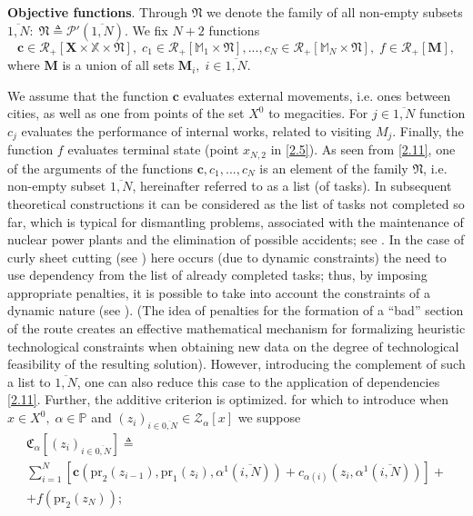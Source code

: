 \documentclass[10pt]{article}
\begin{document}
{\bf Objective functions}.
Through $\mathfrak{N}$
we denote the family of all non-empty subsets
$\overline{1,N}:\;\mathfrak{N} {\triangleq}  \mathcal{P}'(\overline{1,N})$.
We fix $ N + 2 $ functions
\begin{equation}\label{2.11}
  \mathbf{c} \in \mathcal{R}_+[\mathbf{X} \times \mathbb{X} \times \mathfrak{N}],\;
  c_1 \in \mathcal{R}_+[\mathbb{M}_1 \times \mathfrak{N}],...,
  c_N \in \mathcal{R}_+[\mathbb{M}_N \times \mathfrak{N}],\;
  f \in \mathcal{R}_+[\mathbf{M}],
\end{equation}
where $\mathbf{M}$
is a union of all sets
$\mathbf{M}_i,\;i \in \overline{1,N}$.

We assume that the function
$\mathbf{c}$
evaluates external movements,
i.e. ones between cities,
as well as one from points of the set $ X ^ 0 $
to megacities.
For $j \in \overline{1,N}$
function $ c_j $
evaluates the performance of internal works,
related to visiting $ M_j$.
Finally, the function $ f $
evaluates terminal state
(point $x_{N,2}$
in \eqref{2.5}).
As seen from \eqref {2.11},
one of the arguments of the functions
$ \mathbf {c}, c_1, ..., c_N $
is an element of the family $\mathfrak{N}$,
i.e. non-empty subset $\overline{1, N}$,
hereinafter referred to as a list (of tasks).
In subsequent theoretical constructions
it can be considered as
the list of tasks
not completed so far,
which is typical for dismantling problems,
associated with the maintenance of nuclear power plants
and the elimination of possible accidents;
see \cite{1,3}.
In the case of curly sheet cutting
(see \cite{4})
here occurs
(due to dynamic constraints)
the need to use dependency
from the list of already completed tasks;
thus, by imposing appropriate penalties,
it is possible to take into account the constraints of a dynamic nature
(see \cite{18}).
(The idea of penalties
for the formation of a ``bad''
section of the route
creates an effective mathematical mechanism
for formalizing heuristic technological constraints
when obtaining new data on the degree of technological feasibility
of the resulting solution).
However, introducing the complement of such a list to
$\overline{1,N}$,
one can also reduce this case to the application of dependencies
\eqref{2.11}.
Further, the additive criterion is optimized.
for which to introduce
when
$x \in X^0,\;\alpha \in \mathbb{P}$
and
$(z_i)_{i \in \overline{0,N}} \in \mathcal{Z}_\alpha[x]$
we suppose
\begin{multline}\label{2.12}
\mathfrak{C}_{\alpha}[(z_i)_{i \in \overline{0,N}}] {\triangleq}
\\
\sum\limits_{i=1}^N [\mathbf{c}(\mathrm{pr}_2(z_{i-1}),\mathrm{pr}_1(z_i),\alpha^1(\overline{i,N})) +
c_{\alpha(i)}(z_i,\alpha^1(\overline{i,N}))] +
\\
+ f(\mathrm{pr}_2(z_N));
\end{multline}
\end{document}

